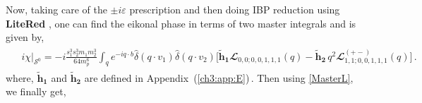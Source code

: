\noindent
Now, taking care of the $\pm i\varepsilon$ prescription and then doing IBP reduction using \textbf{LiteRed} \cite{Lee:2012cn,Lee:2013mka}, one can find the eikonal phase in terms of two master integrals and is given by, %
\begin{align}
    \begin{split}
      &  i\chi\Big|_{\mathcal{S}^0}= -i \frac{s_1^3 s_2^3 m_1 m_2^3}{64 m_p^6}  \int_{q}e^{-iq\cdot b}\hat\delta(q\cdot v_1)\hat\delta(q\cdot v_2)\Bigg[  \boldsymbol{\tilde h_1}\mathbfcal{L}_{0,0;0,0,1,1,1}(q) -\boldsymbol{\boldsymbol{\tilde h_2}}\,q^2\mathbfcal{L}^{(+-)}_{1,1;0,0,1,1,1}(q)\Bigg]\,.
    \end{split}
\end{align}
where, $\boldsymbol{\tilde h_1}$ and $\boldsymbol{\tilde h_2}$ are defined in Appendix~(\ref{ch3:app:E})\,.
Then using \eqref{MasterL}, we finally get,

